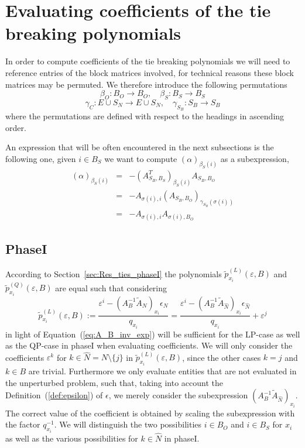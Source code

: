 \documentclass[a4paper]{article}
\begin{document}
\section{Evaluating coefficients of the tie breaking polynomials}
In order to compute coefficients of the tie breaking polynomials we will need to
reference entries of the block matrices involved, for technical reasons these
block matrices may be permuted. We therefore introduce the following
permutations
\begin{equation}
\beta_{O}: B_{O}  \rightarrow  B_{O}, \quad
\beta_{S}: B_{S} \rightarrow  B_{S}
\end{equation}
\begin{equation}
\gamma_{C}: E \cup S_{N} \rightarrow  E \cup S_{N}, \quad
\gamma_{S_{B}}: S_{B} \rightarrow  S_{B} 
\end{equation}
where the permutations are defined with respect to the headings in ascending
order.

An expression that will be often encountered in the next subsections is the
following one, given $i \in B_{S}$ we want to compute
$(\alpha)_{\beta_{S}(i)}$ as a subexpression,
\begin{eqnarray}
\left(\alpha\right)_{\beta_{S}(i)}
&=&
-\left(A_{S_{B}, B_{S}}^{T}\right)_{\beta_{S}(i)}A_{S_{B}, B_{O}}
\nonumber \\
&=&
-A_{\sigma(i), i}\left(A_{S_{B}, B_{O}}\right)_{\gamma_{S_{B}}(\sigma(i))}
\nonumber \\
&=&
\label{eq:alpha_beta_S}
-A_{\sigma(i), i}A_{\sigma(i), B_{O}}
\end{eqnarray}

\subsection{PhaseI}
According to Section~\ref{sec:Res_ties_phaseI} the polynomials
$\tilde{p}_{x_{i}}^{(L)}(\varepsilon, B)$ and
$\tilde{p}_{x_{i}}^{(Q)}(\varepsilon, B)$ are equal such that considering
\begin{equation}
\label{eq:p_x_i_tilde_ref}
\tilde{p}_{x_{i}}^{(L)}\left(\varepsilon, B\right) := 
  \frac{\varepsilon^{i}
  - \left(A_{B}^{-1}\tilde{A}_{N}\right)_{x_{i}}
  \epsilon_{N}}{q_{x_{i}}}
= 
\frac{\varepsilon^{i}
- \left(A_{B}^{-1}\tilde{A}_{\hat{N}}\right)_{x_{i}}
  \epsilon_{\hat{N}}}{q_{x_{i}}}
+ \varepsilon^{j}
\end{equation}
in light of Equation~(\ref{eq:A_B_inv_exp})
will be sufficient for the LP-case as well as the QP-case
in phaseI when evaluating coefficients.
We will only consider the coefficients
$\varepsilon^{k}$ for $k \in \hat{N}= N \setminus \{j\}$ in
$\tilde{p}_{x_{i}}^{(L)}(\varepsilon, B)$,
since the other cases $k=j$ and $k \in B$
are trivial. Furthermore we only evaluate entities that are not evaluated in the
unperturbed problem, such that, taking into account the
Definition~(\ref{def:epsilon}) of $\epsilon$, we merely consider
the subexpression $(A_{B}^{-1}\tilde{A}_{\hat{N}})_{x_{i}}$. The correct value
of the coefficient is obtained by scaling the subexpression with the factor
$q_{x_{i}}^{-1}$.  
We will distinguish the two
possibilities $i \in B_{O}$ and $i \in B_{S}$ for $x_{i}$ as well as the
various possibilities for $k \in \hat{N}$ in phaseI. 
\end{document}
